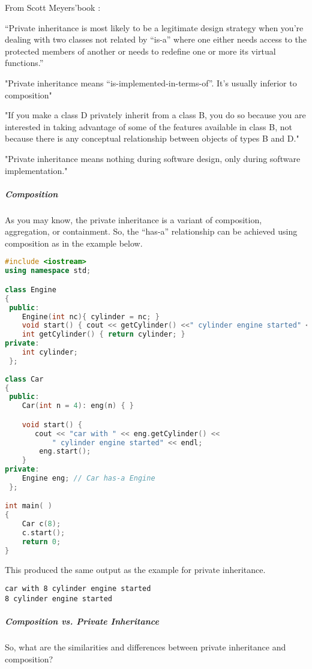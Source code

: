 \documentclass{book}
\begin{document}
From Scott Meyers'book :

    ``Private inheritance is most likely to be a legitimate design strategy when you're dealing with two classes not related by ``is-a'' where
    one either needs access to the protected members of another or needs to redefine one or more its virtual functions.''

    "Private inheritance means ``is-implemented-in-terms-of''. It's usually inferior to composition"

    "If you make a class D privately inherit from a class B, you do so because you are interested in taking advantage of some of the features available in class B,
    not because there is any conceptual relationship between objects of types B and D."

    "Private inheritance means nothing during software design, only during software implementation."

\subparagraph{Composition}

As you may know, the private inheritance is a variant of composition, aggregation, or containment. So, the ``has-a'' relationship can be achieved using composition as in the example below.

\begin{lstlisting}[caption={Private inheritance exmaple 3 Composition}, language=C++]
#include <iostream>
using namespace std;

class Engine 
{
 public:
	Engine(int nc){ cylinder = nc; }
	void start() { cout << getCylinder() <<" cylinder engine started" << endl; };
	int getCylinder() { return cylinder; }
private:
	int cylinder;
 };
 
class Car 
{
 public:
	Car(int n = 4): eng(n) { }	

	void start() {
	   cout << "car with " << eng.getCylinder() <<
		   " cylinder engine started" << endl;
		eng.start();
	}
private:
	Engine eng;	// Car has-a Engine
 }; 

int main( ) 
{ 
	Car c(8);
	c.start();
	return 0; 
}
\end{lstlisting}

This produced the same output as the example for private inheritance.
\begin{verbatim}
car with 8 cylinder engine started
8 cylinder engine started
\end{verbatim}

\subparagraph{Composition vs. Private Inheritance}

So, what are the similarities and differences between private inheritance and composition?
\end{document}
